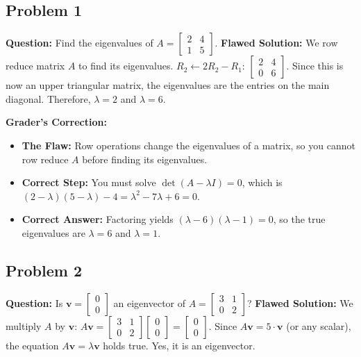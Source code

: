 \documentclass[11pt, a4paper]{article}
\theoremstyle{definition}
\theoremstyle{remark}
\begin{document}
\subsection{Problem 1}
\textbf{Question:} Find the eigenvalues of $A = \begin{bmatrix} 2 & 4 \\ 1 & 5 \end{bmatrix}$.
\textbf{Flawed Solution:} 
We row reduce matrix $A$ to find its eigenvalues.
$R_2 \leftarrow 2R_2 - R_1$: $\begin{bmatrix} 2 & 4 \\ 0 & 6 \end{bmatrix}$.
Since this is now an upper triangular matrix, the eigenvalues are the entries on the main diagonal. Therefore, $\lambda = 2$ and $\lambda = 6$.

\textbf{Grader's Correction:}
\begin{itemize}
    \item \textbf{The Flaw:} Row operations change the eigenvalues of a matrix, so you cannot row reduce $A$ before finding its eigenvalues.
    \item \textbf{Correct Step:} You must solve $\det(A - \lambda I) = 0$, which is $(2-\lambda)(5-\lambda) - 4 = \lambda^2 - 7\lambda + 6 = 0$.
    \item \textbf{Correct Answer:} Factoring yields $(\lambda - 6)(\lambda - 1) = 0$, so the true eigenvalues are $\lambda = 6$ and $\lambda = 1$.
\end{itemize}

\subsection{Problem 2}
\textbf{Question:} Is $\mathbf{v} = \begin{bmatrix} 0 \\ 0 \end{bmatrix}$ an eigenvector of $A = \begin{bmatrix} 3 & 1 \\ 0 & 2 \end{bmatrix}$?
\textbf{Flawed Solution:}
We multiply $A$ by $\mathbf{v}$:
$A\mathbf{v} = \begin{bmatrix} 3 & 1 \\ 0 & 2 \end{bmatrix} \begin{bmatrix} 0 \\ 0 \end{bmatrix} = \begin{bmatrix} 0 \\ 0 \end{bmatrix}$.
Since $A\mathbf{v} = 5 \cdot \mathbf{v}$ (or any scalar), the equation $A\mathbf{v} = \lambda \mathbf{v}$ holds true. Yes, it is an eigenvector.
\end{document}

